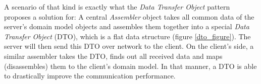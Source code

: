 A scenario of that kind is exactly what the \emph{Data Transfer Object} pattern
\cite{fowler2002} proposes a solution for: A central \emph{Assembler} object
takes all common data of the server's domain model objects and assembles them
together into a special \emph{Data Transfer Object} (DTO), which is a flat data
structure (figure \ref{dto_figure}). The server will then send this DTO over
network to the client. On the client's side, a similar assembler takes the DTO,
finds out all received data and maps (disassembles) them to the client's domain
model. In that manner, a DTO is able to drastically improve the communication
performance.
